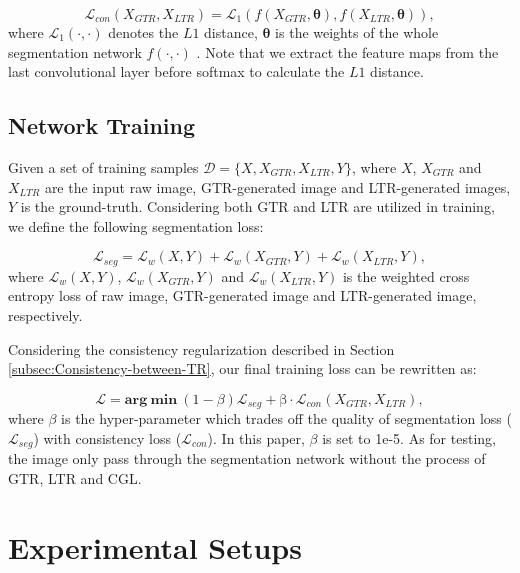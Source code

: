 \documentclass[twocolumn,journal,vlined,ruled,linesnumbered]{IEEEtran}
\begin{document}
\vspace{-2mm}

\begin{equation}
\mathcal{L}_{con}(X_{GTR},X_{LTR})=\mathcal{L}_{1}(f(X_{GTR},\boldsymbol{\theta}),f(X_{LTR},\boldsymbol{\theta})),
\end{equation}
where $\mathcal{L}_{1}(\cdot,\cdot)$ denotes the $L1$ distance, $\boldsymbol{\theta}$ is the weights of the whole segmentation network $f(\cdot,\cdot)$ . Note that we extract the feature maps from the last convolutional layer before softmax to calculate the $L1$ distance.

\subsection{Network Training}

Given a set of training samples $\mathcal{D}=\{X,X_{GTR},X_{LTR},Y\}$, where $X$, $X_{GTR}$ and $X_{LTR}$ are the input raw image, GTR-generated image and LTR-generated images, $Y$ is the ground-truth. Considering both GTR and LTR are utilized in training, we define the following segmentation loss:

\vspace{-2mm}

\begin{equation}
\mathcal{L}_{seg}=\mathcal{L}_{w}(X,Y)+\mathcal{L}_{w}(X_{GTR},Y)+\mathcal{L}_{w}(X_{LTR},Y),\label{eq:lossseg}
\end{equation}
where $\mathcal{L}_{w}(X,Y)$, $\mathcal{L}_{w}(X_{GTR},Y)$ and $\mathcal{L}_{w}(X_{LTR},Y)$ is the weighted cross entropy loss of raw image, GTR-generated image and LTR-generated image, respectively.

Considering the consistency regularization described in Section \ref{subsec:Consistency-between-TR}, our final training loss can be rewritten as:

\begin{equation}
\mathcal{L}=\mathbf{arg~min}~(1-\beta)\mathcal{L}_{seg}+\mathrm{\beta}\cdot\mathcal{L}_{con}(X_{GTR},X_{LTR}),\label{eq:beta}
\end{equation}
where $\beta$ is the hyper-parameter which trades off the quality of segmentation loss ($\mathcal{L}_{seg}$) with consistency loss ($\mathcal{L}_{con}$). In this paper, $\beta$ is set to 1e-5. As for testing, the image only pass through the segmentation network without the process of GTR, LTR and CGL.

\section{Experimental Setups\label{sec:Experimental-Setups}}
\end{document}
